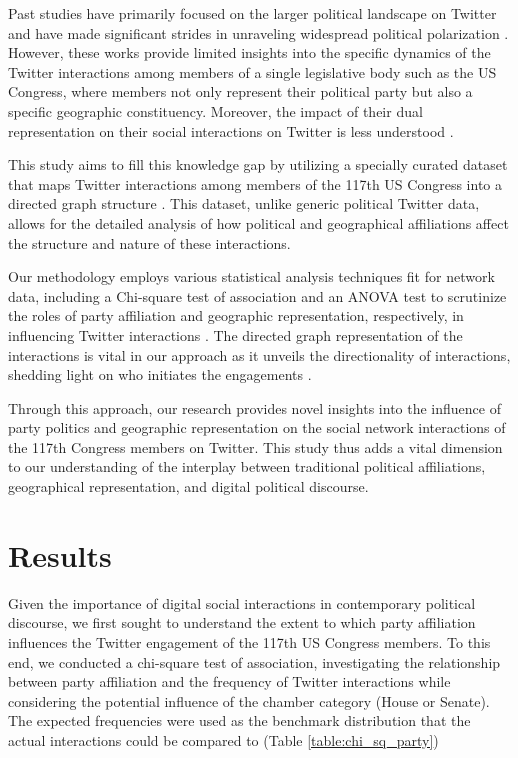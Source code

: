 \documentclass[11pt]{article}
\begin{document}
Past studies have primarily focused on the larger political landscape on Twitter and have made significant strides in unraveling widespread political polarization \cite{Garimella2018PoliticalDO, Luceri2019RedBD}. However, these works provide limited insights into the specific dynamics of the Twitter interactions among members of a single legislative body such as the US Congress, where members not only represent their political party but also a specific geographic constituency. Moreover, the impact of their dual representation on their social interactions on Twitter is less understood \cite{Vliet2020TheTP, Barber2016LessIM}. 

This study aims to fill this knowledge gap by utilizing a specially curated dataset that maps Twitter interactions among members of the 117th US Congress into a directed graph structure \cite{McCreadie2013ScalableDE}. This dataset, unlike generic political Twitter data, allows for the detailed analysis of how political and geographical affiliations affect the structure and nature of these interactions. 

Our methodology employs various statistical analysis techniques fit for network data, including a Chi-square test of association and an ANOVA test to scrutinize the roles of party affiliation and geographic representation, respectively, in influencing Twitter interactions \cite{Farine2015ConstructingCA}. The directed graph representation of the interactions is vital in our approach as it unveils the directionality of interactions, shedding light on who initiates the engagements \cite{Gmez2008StatisticalAO}.

Through this approach, our research provides novel insights into the influence of party politics and geographic representation on the social network interactions of the 117th Congress members on Twitter. This study thus adds a vital dimension to our understanding of the interplay between traditional political affiliations, geographical representation, and digital political discourse.

\section*{Results}

Given the importance of digital social interactions in contemporary political discourse, we first sought to understand the extent to which party affiliation influences the Twitter engagement of the 117th US Congress members. To this end, we conducted a chi-square test of association, investigating the relationship between party affiliation and the frequency of Twitter interactions while considering the potential influence of the chamber category (House or Senate). The expected frequencies were used as the benchmark distribution that the actual interactions could be compared to (Table {}\ref{table:chi_sq_party})
\end{document}
